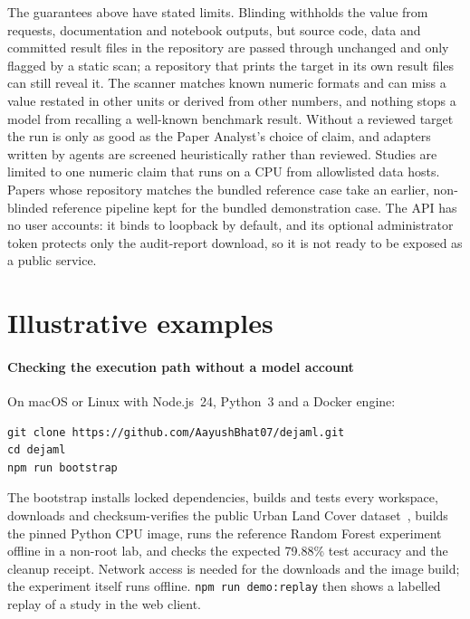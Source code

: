 \documentclass[preprint,12pt]{elsarticle}
\newcommand{\code}[1]{\texttt{#1}}
\begin{document}
The guarantees above have stated limits. Blinding withholds the value from
requests, documentation and notebook outputs, but source code, data and
committed result files in the repository are passed through unchanged and only
flagged by a static scan; a repository that prints the target in its own result
files can still reveal it. The scanner matches known numeric formats and can
miss a value restated in other units or derived from other numbers, and nothing
stops a model from recalling a well-known benchmark result. Without a reviewed
target the run is only as good as the Paper Analyst's choice of claim, and
adapters written by agents are screened heuristically rather than reviewed.
Studies are limited to one numeric claim that runs on a CPU from allowlisted
data hosts. Papers whose repository matches the bundled reference case take an
earlier, non-blinded reference pipeline kept for the bundled demonstration
case. The API has no
user accounts: it binds to loopback by default, and its optional administrator token protects
only the audit-report download, so it is not ready to be exposed as a public service.

\section{Illustrative examples}
\label{sec:examples}

\paragraph{Checking the execution path without a model account}
On macOS or Linux with Node.js~24, Python~3 and a Docker engine:
\begin{lstlisting}
git clone https://github.com/AayushBhat07/dejaml.git
cd dejaml
npm run bootstrap
\end{lstlisting}
The bootstrap installs locked dependencies, builds and tests every workspace,
downloads and checksum-verifies the public Urban Land Cover
dataset~\cite{johnson2013urban}, builds the pinned Python CPU image, runs the
reference Random Forest experiment offline in a non-root lab, and checks the
expected 79.88\% test accuracy and the cleanup receipt. Network access is
needed for the downloads and the image build; the experiment itself runs
offline. \code{npm run demo:replay} then shows a labelled replay of a study in
the web client.
\end{document}
